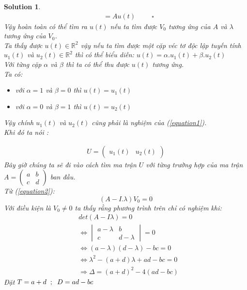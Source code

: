 \documentclass[a4paper]{article}
\newtheorem*{sol}{Solution}
\begin{document}
\begin{sol}
\begin{align*}
    &= A u(t)  \hspace{1cm} \square
\end{align*}
Vậy hoàn toàn có thể tìm ra $u(t)$ nếu ta tìm được $V_0$ tương ứng của $A$ và $\lambda$ tương ứng của $V_0$.   \\
Ta thấy được $u(t) \in \mathbb{R}^{2}$ vậy nếu ta tìm được một cặp véc tơ độc lập tuyến tính $ u_1(t)$ và $u_2(t) \in \mathbb{R}^{2}$ thì có thể biểu diễn: $u(t)=\alpha . u_1(t) + \beta . u_2(t)$\\
Với từng cặp $\alpha$ và $\beta$ thì ta có thể thu được $u(t)$ tương ứng.\\
Ta có:
\begin{itemize}
    \item với $\alpha = 1$ và $\beta = 0$ thì $u(t) = u_1(t)$
    \item với $\alpha = 0$ và $\beta=1$ thì $u(t)=u_2(t)$
\end{itemize}
Vậy chính $u_1(t)$ và $u_2(t)$ cũng phải là nghiệm của (\ref{equation1}).\\
Khi đó ta nói :

\begin{align} \label{model1}
    U= \begin{pmatrix}
        u_1(t)  & u_2(t)
    \end{pmatrix} \tag{**}
\end{align}
Bây giờ chúng ta sẽ đi vào cách tìm ma trận $U$ với từng trường hợp của ma trận $A= \begin{pmatrix}
    a & b \\
    c & d
\end{pmatrix}$ ban đầu. \\
Từ (\ref{equation2}):
\begin {equation} \label {equation5}
 (A-I.\lambda) V_0=0
\end{equation}
Với điều kiện là $V_0 \neq 0$ ta thấy rằng phương trình trên chỉ có nghiệm khi:
\begin{align*}
    &det(A-I \lambda) =0 \\
    &\Leftrightarrow \begin{vmatrix}
    a- \lambda  & b\\ 
    c & d - \lambda 
    \end{vmatrix} = 0 \\
    &\Leftrightarrow (a- \lambda) (d- \lambda)-bc=0 \\
    &\Leftrightarrow \lambda^{2} - (a+d) \lambda +ad-bc=0 \\
    &\Rightarrow \Delta = (a+d)^{2} - 4 (ad-bc)
\end{align*}
Đặt $T=a+d \hspace{0.2cm} ; \hspace{0.2cm} D=ad-bc$ \\ 


\end{sol}
\end{document}
